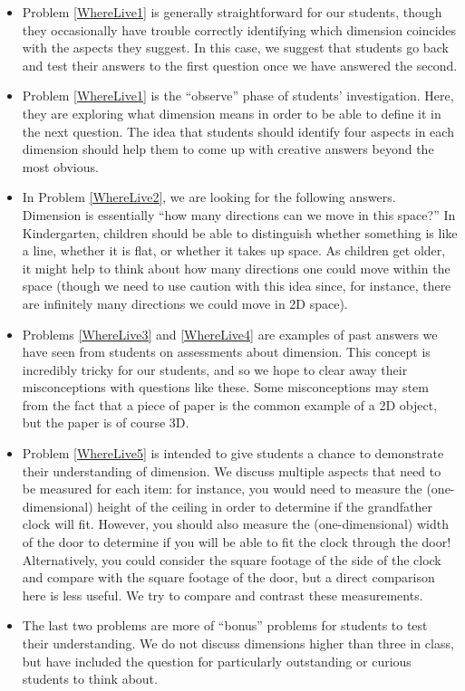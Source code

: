 \documentclass{ximera}
\begin{document}
\begin{instructorNotes}
    
\begin{itemize}
    \item Problem \ref{WhereLive1} is generally straightforward for our students, though they occasionally have trouble correctly identifying which dimension coincides with the aspects they suggest.  In this case, we suggest that students go back and test their answers to the first question once we have answered the second.
    \item Problem \ref{WhereLive1} is the ``observe'' phase of students' investigation.  Here, they are exploring what dimension means in order to be able to define it in the next question.  The idea that students should identify four aspects in each dimension should help them to come up with creative answers beyond the most obvious.
    \item In Problem \ref{WhereLive2}, we are looking for the following answers. Dimension is essentially ``how many directions can we move in this space?'' In Kindergarten, children should be able to distinguish whether something is like a line, whether it is flat, or whether it takes up space.  As children get older, it might help to think about how many directions one could move within the space (though we need to use caution with this idea since, for instance, there are infinitely many directions we could move in 2D space).
    \item Problems \ref{WhereLive3} and \ref{WhereLive4} are examples of past answers we have seen from students on assessments about dimension.  This concept is incredibly tricky for our students, and so we hope to clear away their misconceptions with questions like these.  Some misconceptions may stem from the fact that a piece of paper is the common example of a 2D object, but the paper is of course 3D.
    \item Problem \ref{WhereLive5} is intended to give students a chance to demonstrate their understanding of dimension.  We discuss multiple aspects that need to be measured for each item: for instance, you would need to measure the (one-dimensional) height of the ceiling in order to determine if the grandfather clock will fit.  However, you should also measure the (one-dimensional) width of the door to determine if you will be able to fit the clock through the door!  Alternatively, you could consider the square footage of the side of the clock and compare with the square footage of the door, but a direct comparison here is less useful.  We try to compare and contrast these measurements.
    \item The last two problems are more of ``bonus'' problems for students to test their understanding.  We do not discuss dimensions higher than three in class, but have included the question for particularly outstanding or curious students to think about.
\end{itemize}
 
    
    
\end{instructorNotes}
\end{document}
